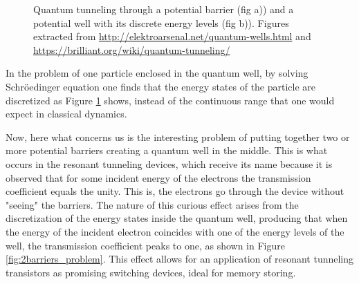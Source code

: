 \documentclass[12pt,a4paper,onecolumn]{article}
\theoremstyle{definition}
\theoremstyle{plain}
\begin{document}
\begin{figure}[h!]
\centering
	\caption{Quantum tunneling through a potential barrier (fig a)) and a potential well with its discrete energy levels (fig b)). Figures extracted from {\url{http://elektroarsenal.net/quantum-wells.html}} and {\url{https://brilliant.org/wiki/quantum-tunneling/}} }
	\label{fig:1Dproblems}
\end{figure}

In the problem of one particle enclosed in the quantum well, by solving Schröedinger equation one finds that the energy states of the particle are discretized as Figure \ref {fig:1Dproblems} shows, instead of the continuous range that one would expect in classical dynamics. 

Now, here what concerns us is the interesting problem of putting together two or more potential barriers creating a quantum well in the middle. This is what occurs in the resonant tunneling devices, which receive its name because it is observed that for some incident energy of the electrons the transmission coefficient equals the unity. This is, the electrons go through the device without "seeing" the barriers. The nature of this curious effect arises from the discretization of the energy states inside the quantum well, producing that when the energy of the incident electron coincides with one of the energy levels of the well, the transmission coefficient peaks to one, as shown in Figure \ref {fig:2barriers_problem}. This effect allows for an application of resonant tunneling transistors as promising switching devices, ideal for memory storing. 
\end{document}
